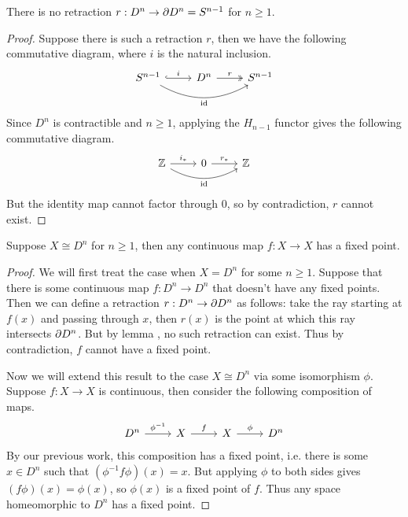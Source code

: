 \documentclass[twoside,10pt]{article}
\begin{document}
\begin{lem}
	\label{no-retraction}
There is no retraction $r:D^{n}\to \partial D^{n} = S^{n-1}$ for $n \geq 1$.
\end{lem}
\begin{proof}
	Suppose there is such a retraction $r$, then we have the following commutative diagram, where $i$ is the natural inclusion.
	\[
		\begin{tikzcd}
			S^{n-1} \rar[hook]{i} \arrow[rr, bend right, "\id"'] & D^{n} \rar[two heads]{r} & S^{n-1}
		\end{tikzcd}
	\] 
	Since $D^{n}$ is contractible and $n \geq 1$, applying the $H_{n-1}$ functor gives the following commutative diagram.
	\[
		\begin{tikzcd}
			\mathbb{Z} \rar{i_{*}} \arrow[rr, bend right, "\id"'] & 0 \rar{r_{*}} & \mathbb{Z}
		\end{tikzcd}
	\] 
	But the identity map cannot factor through 0, so by contradiction, $r$ cannot exist.
\end{proof}

\begin{thrm}
	Suppose $X \cong D^{n}$ for $n \geq 1$, then any continuous map $f:X\to X$ has a fixed point.
\end{thrm}
\begin{proof}
	We will first treat the case when $X = D^{n}$ for some $n \geq 1$. Suppose that there is some continuous map $f:D^{n}\to D^{n}$ that doesn't have any fixed points. Then we can define a retraction $r:D^{n}\to \partial D^{n}$ as follows: take the ray starting at $f(x)$ and passing through $x$, then $r(x)$ is the point at which this ray intersects $\partial D^{n}$. But by lemma , no such retraction can exist. Thus by contradiction, $f$ cannot have a fixed point.

	Now we will extend this result to the case $X \cong D^{n}$ via some isomorphism $\phi$. Suppose $f:X\to X$ is continuous, then consider the following composition of maps.
	\[
	\begin{tikzcd}
		D^{n} \rar{\phi^{-1}} & X \rar{f} & X \rar{\phi} & D^{n}
	\end{tikzcd}
\] By our previous work, this composition has a fixed point, i.e. there is some $x \in D^{n}$ such that $(\phi^{-1}f \phi)(x) = x$. But applying $\phi$ to both sides gives $(f\phi)(x) = \phi(x)$, so $\phi(x)$ is a fixed point of $f$. Thus any space homeomorphic to $D^{n}$ has a fixed point.
\end{proof}
\end{document}
